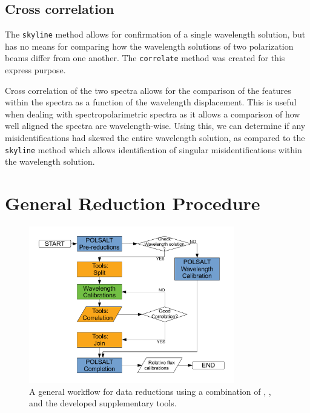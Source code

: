 \subsection{Cross correlation}

The \texttt{skyline} method allows for confirmation of a single wavelength solution, but has no means for comparing how the wavelength solutions of two polarization beams differ from one another. The \texttt{correlate} method was created for this express purpose.
\prgph

Cross correlation of the two spectra allows for the comparison of the features within the spectra as a function of the wavelength displacement. This is useful when dealing with spectropolarimetric spectra as it allows a comparison of how well aligned the spectra are wavelength-wise. Using this, we can determine if any misidentifications had skewed the entire wavelength solution, as compared to the \texttt{skyline} method which allows identification of singular misidentifications within the wavelength solution.
\prgph





\section{General Reduction Procedure}\label{sec:red_proc}

\begin{figure}[t]
    \centering
    \includegraphics[width = 0.8\textwidth]{figures/3_new_workflow.pdf}
    \caption{A general workflow for data reductions using a combination of \polsalt, \iraf, and the developed supplementary tools.}
    \label{fig:new_workflow}
\end{figure}

